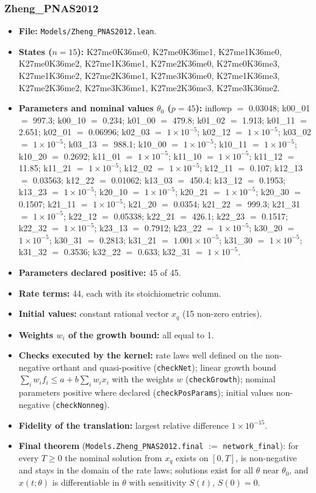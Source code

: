 \subsubsection*{Zheng\_PNAS2012}

\begin{itemize}\itemsep0pt\small
\item \textbf{File:} \texttt{Models/Zheng\_PNAS2012.lean}.
\item \textbf{States ($n=15$):} K27me0K36me0, K27me0K36me1, K27me1K36me0, K27me0K36me2, K27me1K36me1, K27me2K36me0, K27me0K36me3, K27me1K36me2, K27me2K36me1, K27me3K36me0, K27me1K36me3, K27me2K36me2, K27me3K36me1, K27me2K36me3, K27me3K36me2.
\item \textbf{Parameters and nominal values $\theta_0$ ($p=45$):} inflowp $=$ 0.03048; k00\_01 $=$ 997.3; k00\_10 $=$ 0.234; k01\_00 $=$ 479.8; k01\_02 $=$ 1.913; k01\_11 $=$ 2.651; k02\_01 $=$ 0.06996; k02\_03 $=$ $1\times10^{-5}$; k02\_12 $=$ $1\times10^{-5}$; k03\_02 $=$ $1\times10^{-5}$; k03\_13 $=$ 988.1; k10\_00 $=$ $1\times10^{-5}$; k10\_11 $=$ $1\times10^{-5}$; k10\_20 $=$ 0.2692; k11\_01 $=$ $1\times10^{-5}$; k11\_10 $=$ $1\times10^{-5}$; k11\_12 $=$ 11.85; k11\_21 $=$ $1\times10^{-5}$; k12\_02 $=$ $1\times10^{-5}$; k12\_11 $=$ 0.107; k12\_13 $=$ 0.03563; k12\_22 $=$ 0.01062; k13\_03 $=$ 450.4; k13\_12 $=$ 0.1953; k13\_23 $=$ $1\times10^{-5}$; k20\_10 $=$ $1\times10^{-5}$; k20\_21 $=$ $1\times10^{-5}$; k20\_30 $=$ 0.1507; k21\_11 $=$ $1\times10^{-5}$; k21\_20 $=$ 0.0354; k21\_22 $=$ 999.3; k21\_31 $=$ $1\times10^{-5}$; k22\_12 $=$ 0.05338; k22\_21 $=$ 426.1; k22\_23 $=$ 0.1517; k22\_32 $=$ $1\times10^{-5}$; k23\_13 $=$ 0.7912; k23\_22 $=$ $1\times10^{-5}$; k30\_20 $=$ $1\times10^{-5}$; k30\_31 $=$ 0.2813; k31\_21 $=$ $1.001\times10^{-5}$; k31\_30 $=$ $1\times10^{-5}$; k31\_32 $=$ 0.3536; k32\_22 $=$ 0.633; k32\_31 $=$ $1\times10^{-5}$.
\item \textbf{Parameters declared positive:} 45 of 45.
\item \textbf{Rate terms:} 44, each with its stoichiometric column.
\item \textbf{Initial values:} constant rational vector $x_q$ (15 non-zero entries).
\item \textbf{Weights $w_i$ of the growth bound:} all equal to 1.
\item \textbf{Checks executed by the kernel:} rate laws well defined on the non-negative orthant and quasi-positive (\texttt{checkNet}); linear growth bound $\sum_iw_if_i\le a+b\sum_iw_ix_i$ with the weights $w$ (\texttt{checkGrowth}); nominal parameters positive where declared (\texttt{checkPosParams}); initial values non-negative (\texttt{checkNonneg}).
\item \textbf{Fidelity of the translation:} largest relative difference $1\times10^{-15}$.
\item \textbf{Final theorem} (\texttt{Models.Zheng\_PNAS2012.final} $:=$ \texttt{network\_final}): for every $T\ge0$ the nominal solution from $x_q$ exists on $[0,T]$, is non-negative and stays in the domain of the rate laws; solutions exist for all $\theta$ near $\theta_0$, and $x(t;\theta)$ is differentiable in $\theta$ with sensitivity $S(t)$, $S(0)=0$.
\end{itemize}

